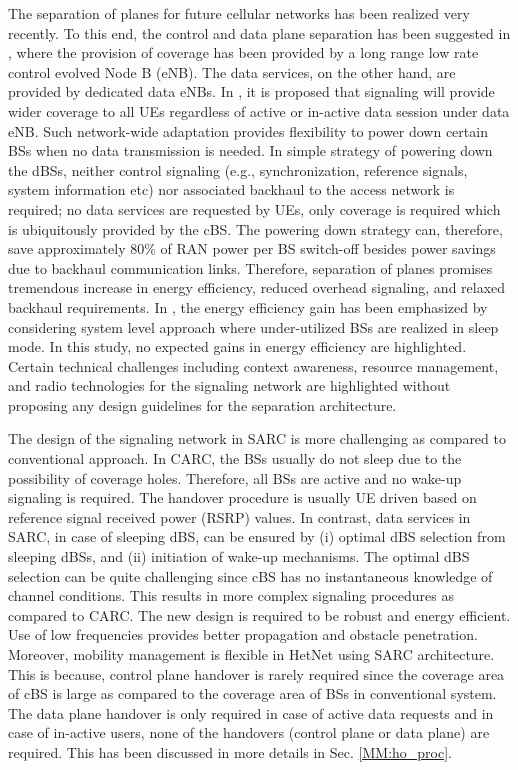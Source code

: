 \documentclass[article,10pt,twocolumn]{IEEEtran}
\begin{document}
The separation of planes for future cellular networks has been realized very recently. To this end, the control and data plane separation has been suggested in \citep{6152217, 6515050}, where the provision of coverage has been provided by a long range low rate control evolved Node B (eNB). The data services, on the other hand, are provided by dedicated data eNBs. In \citep{6152217}, it is proposed that signaling will provide wider coverage to all UEs regardless of active or in-active data session under data eNB. Such network-wide adaptation provides flexibility to power down certain BSs when no data transmission is needed. In simple strategy of powering down the dBSs, neither control signaling (e.g., synchronization, reference signals, system information etc) nor associated backhaul to the access network is required; no data services are requested by UEs, only coverage is required which is ubiquitously provided by the cBS. The powering down strategy can, therefore, save approximately 80\% of RAN power per BS switch-off \citep{6152217, 6056691,4448824} besides power savings due to backhaul communication links. Therefore, separation of planes promises tremendous increase in energy efficiency, reduced overhead signaling, and relaxed backhaul requirements. In \citep{6152217}, the energy efficiency gain has been emphasized by considering system level approach where under-utilized BSs are realized in sleep mode. In this study, no expected gains in energy efficiency are highlighted. Certain technical challenges including context awareness, resource management, and radio technologies for the signaling network are highlighted without proposing any design guidelines for the separation architecture.

The design of the signaling network in SARC is more challenging as compared to conventional approach. In CARC, the BSs usually do not sleep due to the possibility of coverage holes. Therefore, all BSs are active and no wake-up signaling is required. The handover procedure is usually UE driven based on reference signal received power (RSRP) values. In contrast, data services in SARC, in case of sleeping dBS, can be ensured by (i) optimal dBS selection from sleeping dBSs, and (ii) initiation of wake-up mechanisms. The optimal dBS selection can be quite challenging since cBS has no instantaneous knowledge of channel conditions. This results in more complex signaling procedures as compared to CARC. The new design is required to be robust and energy efficient. Use of low frequencies provides better propagation and obstacle penetration. Moreover, mobility management is flexible in HetNet using SARC architecture. This is because, control plane handover is rarely required since the coverage area of cBS is large as compared to the coverage area of BSs in conventional system. The data plane handover is only required in case of active data requests and in case of in-active users, none of the handovers (control plane or data plane) are required. This has been discussed in more details in Sec. \ref{MM:ho_proc}.
\end{document}
